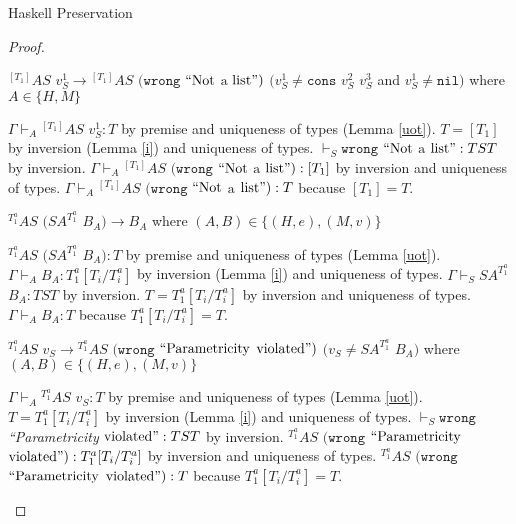 \begin{theorem}{Haskell Preservation}
\begin{proof}

\begin{case}
$^{[T_{1}]}AS$ $v_{S}^{1}\rightarrow{^{[T_{1}]}A}S$ $(\mathtt{wrong}$ $\mathrm{``Not}$ $\mathrm{a}$ $\mathrm{list"})$ $(v_{S}^{1}\neq\mathtt{cons}$ $v_{S}^{2}$ $v_{S}^{3}$ and $v_{S}^{1}\neq\mathtt{nil})$ where $A\in\lbrace H,M\rbrace$

$\Gamma\vdash_{A}{^{[T_{1}]}AS}$ $v_{S}^{1}:T$ by premise and uniqueness of types (Lemma \ref{uot}).  $T=[T_{1}]$ by inversion (Lemma \ref{i}) and uniqueness of types.  $\vdash_{S}\mathtt{wrong}$ $\mathrm{``Not}$ $\mathrm{a}$ $\mathrm{list"}:TST$ by inversion.  $\Gamma\vdash_{A}{^{[T_{1}]}A}S$ $(\mathtt{wrong}$ $\mathrm{``Not}$ $\mathrm{a}$ $\mathrm{list"}):[T_{1}]$ by inversion and uniqueness of types.  $\Gamma\vdash_{A}{^{[T_{1}]}A}S$ $(\mathtt{wrong}$ $\mathrm{``Not}$ $\mathrm{a}$ $\mathrm{list"}):T$ because $[T_{1}]=T$.
\end{case}


\begin{case}
$^{T_{1}^{a}}AS$ $(SA^{T_{1}^{a}}$ $B_{A})\rightarrow B_{A}$ where $(A,B)\in\lbrace(H,e),(M,v)\rbrace$

$^{T_{1}^{a}}AS$ $(SA^{T_{1}^{a}}$ $B_{A}):T$ by premise and uniqueness of types (Lemma \ref{uot}).  $\Gamma\vdash_{A}B_{A}:T_{1}^{a}[T_{i}/T_{i}^{a}]$ by inversion (Lemma \ref{i}) and uniqueness of types.  $\Gamma\vdash_{S}SA^{T_{1}^{a}}$ $B_{A}:TST$ by inversion.  $T=T_{1}^{a}[T_{i}/T_{i}^{a}]$ by inversion and uniqueness of types.  $\Gamma\vdash_{A}B_{A}:T$ because $T_{1}^{a}[T_{i}/T_{i}^{a}]=T$.
\end{case}


\begin{case}
$^{T_{1}^{a}}AS$ $v_{S}\rightarrow{^{T_{1}^{a}}A}S$ $(\mathtt{wrong}$ $\mathrm{``Parametricity}$ $\mathrm{violated"})$ $(v_{S}\neq SA^{T_{1}^{a}}$ $B_{A})$ where $(A,B)\in\lbrace(H,e),(M,v)\rbrace$

$\Gamma\vdash_{A}{^{T_{1}^{a}}A}S$ $v_{S}:T$ by premise and uniqueness of types (Lemma \ref{uot}).  $T=T_{1}^{a}[T_{i}/T_{i}^{a}]$ by inversion (Lemma \ref{i}) and uniqueness of types.  $\vdash_{S}\mathtt{wrong}$ \emph{``Parametricity} $\mathrm{violated"}:TST$ by inversion.  $^{T_{1}^{a}}AS$ $(\mathtt{wrong}$ $\mathrm{``Parametricity}$ $\mathrm{violated"}):T_{1}^{a}[T_{i}/T_{i}^{a}]$ by inversion and uniqueness of types.  $^{T_{1}^{a}}AS$ $(\mathtt{wrong}$ $\mathrm{``Parametricity}$ $\mathrm{violated"}):T$ because $T_{1}^{a}[T_{i}/T_{i}^{a}]=T$.
\end{case}


\end{proof}
\end{theorem}
